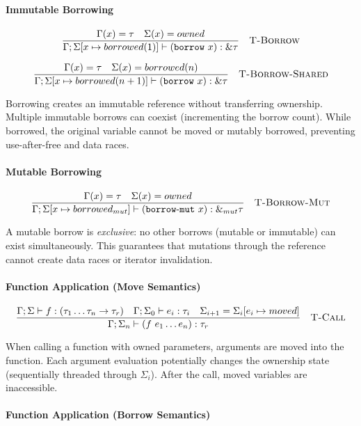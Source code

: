 \documentclass[11pt,a4paper,twoside]{book}
\begin{document}
\paragraph{Immutable Borrowing}

\[
\frac{
  \Gamma(x) = \tau \quad \Sigma(x) = owned
}{
  \Gamma ; \Sigma[x \mapsto borrowed(1)] \vdash (\mathtt{borrow}\ x) : \&\tau
}
\quad \textsc{T-Borrow}
\]

\[
\frac{
  \Gamma(x) = \tau \quad \Sigma(x) = borrowed(n)
}{
  \Gamma ; \Sigma[x \mapsto borrowed(n+1)] \vdash (\mathtt{borrow}\ x) : \&\tau
}
\quad \textsc{T-Borrow-Shared}
\]

Borrowing creates an immutable reference without transferring ownership. Multiple
immutable borrows can coexist (incrementing the borrow count). While borrowed,
the original variable cannot be moved or mutably borrowed, preventing
use-after-free and data races.

\paragraph{Mutable Borrowing}

\[
\frac{
  \Gamma(x) = \tau \quad \Sigma(x) = owned
}{
  \Gamma ; \Sigma[x \mapsto borrowed_{mut}] \vdash (\mathtt{borrow\text{-}mut}\ x) : \&_{mut}\tau
}
\quad \textsc{T-Borrow-Mut}
\]

A mutable borrow is \emph{exclusive}: no other borrows (mutable or immutable) can
exist simultaneously. This guarantees that mutations through the reference cannot
create data races or iterator invalidation.

\paragraph{Function Application (Move Semantics)}

\[
\frac{
  \Gamma ; \Sigma \vdash f : (\tau_1 \dots \tau_n \rightarrow \tau_r) \quad
  \Gamma ; \Sigma_0 \vdash e_i : \tau_i \quad
  \Sigma_{i+1} = \Sigma_i[e_i \mapsto moved]
}{
  \Gamma ; \Sigma_n \vdash (f\ e_1 \dots e_n) : \tau_r
}
\quad \textsc{T-Call}
\]

When calling a function with owned parameters, arguments are moved into the
function. Each argument evaluation potentially changes the ownership state
(sequentially threaded through $\Sigma_i$). After the call, moved variables
are inaccessible.

\paragraph{Function Application (Borrow Semantics)}
\end{document}
